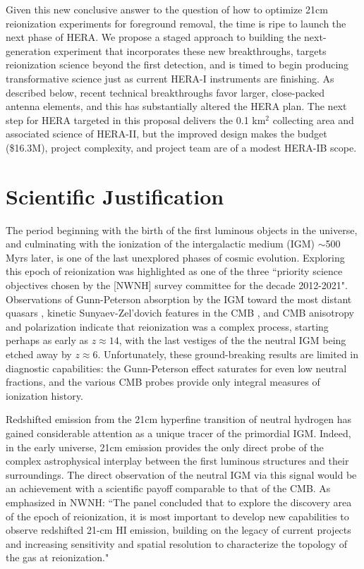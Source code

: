 \documentclass[preprint]{aastex}
\begin{document}
Given this new conclusive answer to the question of how to optimize 21cm reionization
experiments for foreground removal,
the time is ripe to launch the next phase of HERA.  We propose a
staged approach to building the next-generation experiment that incorporates these
new breakthroughs, targets reionization science beyond the first detection, and
is timed to begin producing transformative science just as current HERA-I instruments
are finishing.  As described below, recent technical breakthroughs favor
larger, close-packed antenna elements, and this has substantially altered the
HERA plan.  The next step for HERA targeted in this proposal delivers the 0.1
km$^2$ collecting area and associated science of HERA-II, but 
the improved design makes
the budget (\$16.3M), project complexity, and project team are of
a modest HERA-IB scope.

\vspace{-0.25in}
\section{Scientific Justification}

The period beginning with the birth of the first luminous objects in the
universe, and culminating with the ionization of the intergalactic medium (IGM)
$\sim$500 Myrs later, is one of the last unexplored phases of cosmic evolution.
Exploring this epoch of reionization was highlighted as one of the three
``priority science objectives chosen by the [NWNH] survey committee for the
decade 2012-2021". Observations of Gunn-Peterson absorption
by the IGM toward the most distant quasars \citep{fan_et_al2006}, kinetic
Sunyaev-Zel'dovich features in the CMB \citep{zahn_et_al2012}, and CMB
anisotropy and polarization \citep{page_et_al2007,planck_et_al2013} indicate
that reionization was a complex process, starting perhaps as early as 
$z\approx14$, with the last vestiges of the the neutral IGM being etched away by
$z\approx6$.  Unfortunately, these ground-breaking results are limited in
diagnostic capabilities: the Gunn-Peterson effect saturates for even low
neutral fractions, and the various CMB probes provide only integral measures of 
ionization history.

Redshifted emission from the 21cm hyperfine transition of neutral hydrogen has
gained considerable attention as a unique tracer of the
primordial IGM.  Indeed, in the early universe, 21cm emission provides the
only direct probe of the complex astrophysical interplay between the first luminous
structures and their surroundings.  The direct observation of the neutral IGM via this signal
would be an achievement with a scientific payoff comparable to that of the CMB.  As
emphasized in NWNH: ``The panel concluded that to explore the
discovery area of the epoch of reionization, it is most important to develop
new capabilities to observe redshifted 21-cm HI emission, building on the
legacy of current projects and increasing sensitivity and spatial resolution to
characterize the topology of the gas at reionization."  
\end{document}
